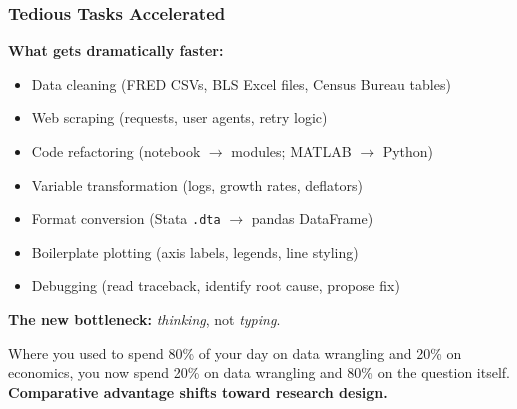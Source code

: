 \documentclass[10pt,english,aspectratio=169]{beamer}
\begin{document}
\begin{frame}
\frametitle{Tedious Tasks Accelerated}

\textbf{What gets dramatically faster:}
\begin{itemize}
    \item Data cleaning (FRED CSVs, BLS Excel files, Census Bureau tables)
    \item Web scraping (requests, user agents, retry logic)
    \item Code refactoring (notebook $\to$ modules; MATLAB $\to$ Python)
    \item Variable transformation (logs, growth rates, deflators)
    \item Format conversion (Stata \texttt{.dta} $\to$ pandas DataFrame)
    \item Boilerplate plotting (axis labels, legends, line styling)
    \item Debugging (read traceback, identify root cause, propose fix)
\end{itemize}

\vspace{0.3cm}

\textbf{The new bottleneck:} \textit{thinking}, not \textit{typing}.

\vspace{0.2cm}

Where you used to spend 80\% of your day on data wrangling and 20\% on economics, you now spend 20\% on data wrangling and 80\% on the question itself. \textbf{Comparative advantage shifts toward research design.}
\end{frame}
\end{document}
